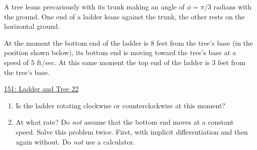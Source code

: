 \documentclass{ximera}
\begin{document}
\begin{question}  \label{Qvgggbbhhhggg}
A tree leans precariously with its trunk making an angle of $\phi = \pi/3$ radians with the ground. One end of a ladder leans against the trunk, the other rests on the horizontal ground.

At the moment the bottom end of the ladder is $8$ feet from the tree's base (in the position shown below), its bottom end is moving toward the tree's base at a speed of $5$ ft/sec. At this same moment the top end of the ladder is $3$ feet from the tree's base.

 
\begin{onlineOnly}
   \begin{center}
\end{center}
\end{onlineOnly}

\href{https://www.desmos.com/calculator/oftz4vb9qj}{151: Ladder and Tree 22}

\begin{enumerate}
\item Is the ladder rotating clockwise or counterclockwise at this moment?

\item At what rate? Do \emph{not} assume that the bottom end moves at a constant speed. Solve this problem twice. First, with implicit differentiation and then again without. Do \emph{not} use a calculator. 
\end{enumerate}


\end{question}
\end{document}
